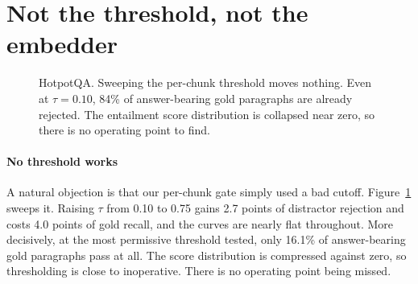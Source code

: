 \documentclass[conference]{IEEEtran}
\begin{document}
\section{Not the threshold, not the embedder}
\label{sec:threshold}

\begin{figure}[t]
\centering
{}
\caption{HotpotQA. Sweeping the per-chunk threshold moves nothing. Even at
$\tau=0.10$, 84\% of answer-bearing gold paragraphs are already rejected. The
entailment score distribution is collapsed near zero, so there is no operating
point to find.}
\label{fig:sweep}
\end{figure}

\paragraph{No threshold works}
A natural objection is that our per-chunk gate simply used a bad cutoff.
Figure~\ref{fig:sweep} sweeps it. Raising $\tau$ from 0.10 to 0.75 gains 2.7
points of distractor rejection and costs 4.0 points of gold recall, and the
curves are nearly flat throughout. More decisively, at the most permissive
threshold tested, only 16.1\% of answer-bearing gold paragraphs pass at all. The
score distribution is compressed against zero, so thresholding is close to
inoperative. There is no operating point being missed.
\end{document}
